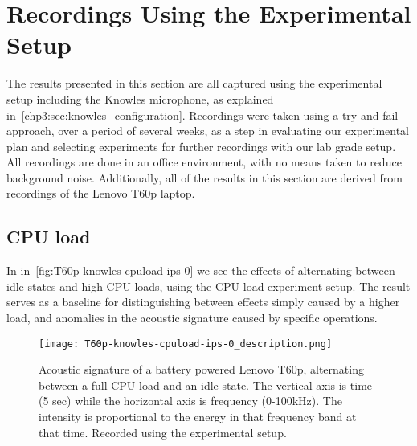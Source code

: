 
\section{Recordings Using the Experimental Setup}\label{chp5:sec:knowles_results}
The results presented in this section are all captured using the experimental setup including the Knowles microphone, as explained in~\autoref{chp3:sec:knowles_configuration}.
Recordings were taken using a try-and-fail approach, over a period of several weeks, as a step in evaluating our experimental plan and selecting experiments for further recordings with our lab grade setup.
All recordings are done in an office environment, with no means taken to reduce background noise.
Additionally, all of the results in this section are derived from recordings of the Lenovo T60p laptop.

\subsection{CPU load}\label{chp5:subsec:t60p_knowles_results_cpuload}
In in~\autoref{fig:T60p-knowles-cpuload-ips-0} we see the effects of alternating between idle states and high \gls{CPU} loads, using the \gls{CPU} load experiment setup.
The result serves as a baseline for distinguishing between effects simply caused by a higher load, and anomalies in the acoustic signature caused by specific operations.

\begin{figure}[ht]
    \centering
    \texttt{[image: T60p-knowles-cpuload-ips-0\_description.png]}
    \caption{Acoustic signature of a battery powered Lenovo T60p, alternating between a full \gls{CPU} load and an idle state.
        The vertical axis is time (5 sec) while the horizontal axis is frequency (0-100kHz).
        The intensity is proportional to the energy in that frequency band at that time.
        Recorded using the experimental setup.}
    \label{fig:T60p-knowles-cpuload-ips-0}
\end{figure}

